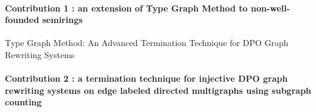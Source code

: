 \paragraph{Contribution 1 : an extension of Type Graph Method to non-well-founded semirings}
Type Graph Method: An Advanced Termination Technique for DPO Graph Rewriting Systems
 
\paragraph{Contribution 2 : a termination technique for injective DPO graph rewriting systems on edge labeled directed multigraphs using subgraph counting}
